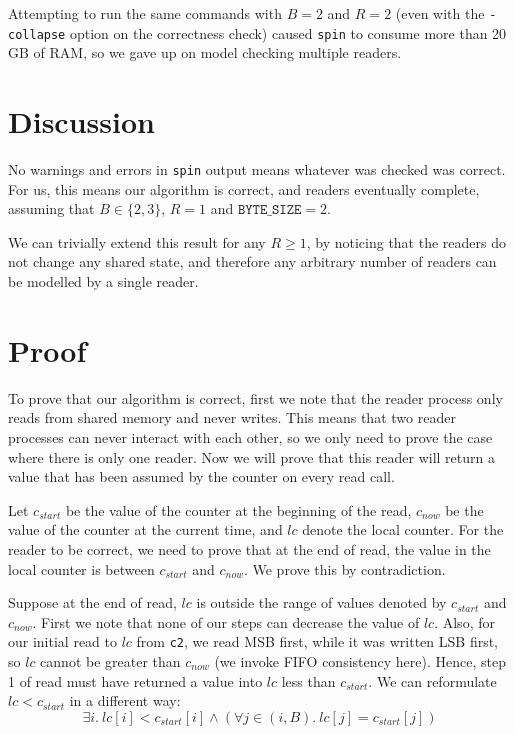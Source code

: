 \documentclass[a4paper]{scrartcl}
\begin{document}
Attempting to run the same commands with \(B = 2\) and \(R = 2\) (even with the \texttt{-collapse} option on the correctness check) caused \texttt{spin} to consume more than 20 GB of RAM, so we gave up on model checking multiple readers.

\section{Discussion}
No warnings and errors in \texttt{spin} output means whatever was checked was correct. For us, this means our algorithm is correct, and readers eventually complete, assuming that \(B \in \{2, 3\}\), \(R = 1\) and \(\texttt{BYTE\_SIZE} = 2\).

We can trivially extend this result for any \(R \ge 1\), by noticing that the readers do not change any shared state, and therefore any arbitrary number of readers can be modelled by a single reader.

\section{Proof}
To prove that our algorithm is correct, first we note that the reader process only reads from shared memory and never writes. This means that two reader processes can never interact with each other, so we only need to prove the case where there is only one reader. Now we will prove that this reader will return a value that has been assumed by the counter on every read call.

Let \(c_{start}\) be the value of the counter at the beginning of the read, \(c_{now}\) be the value of the counter at the current time, and \(lc\) denote the local counter. For the reader to be correct, we need to prove that at the end of read, the value in the local counter is between \(c_{start}\) and \(c_{now}\). We prove this by contradiction.

Suppose at the end of read, \(lc\) is outside the range of values denoted by \(c_{start}\) and \(c_{now}\). First we note that none of our steps can decrease the value of \(lc\). Also, for our initial read to \(lc\) from \texttt{c2}, we read MSB first, while it was written LSB first, so \(lc\) cannot be greater than \(c_{now}\) (we invoke FIFO consistency here). Hence, step 1 of read must have returned a value into \(lc\) less than \(c_{start}\). We can reformulate \(lc < c_{start}\) in a different way:
\[\exists i.\ lc[i] < c_{start}[i] \land (\forall j \in (i, B).\ lc[j] = c_{start}[j])\]
\end{document}
